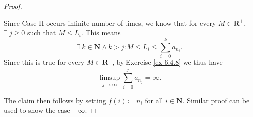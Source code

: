 \begin{proof}
\begin{itemize}
              Since Case II occurs infinite number of times, we know that for every \(M \in \mathbf{R}^+\), \(\exists\ j \geq 0\) such that \(M \leq L_i\).
              This means
              \[
                  \exists\ k \in \mathbf{N} \land k > j : M \leq L_i \leq \sum_{i = 0}^k a_{n_i}.
              \]
              Since this is true for every \(M \in \mathbf{R}^+\), by Exercise \ref{ex 6.4.8} we thus have
              \[
                  \limsup_{j \to \infty} \sum_{i = 0}^j a_{n_j} = \infty.
              \]
    \end{itemize}
    The claim then follows by setting \(f(i) \coloneqq n_i\) for all \(i \in \mathbf{N}\).
    Similar proof can be used to show the case \(-\infty\).
\end{proof}
